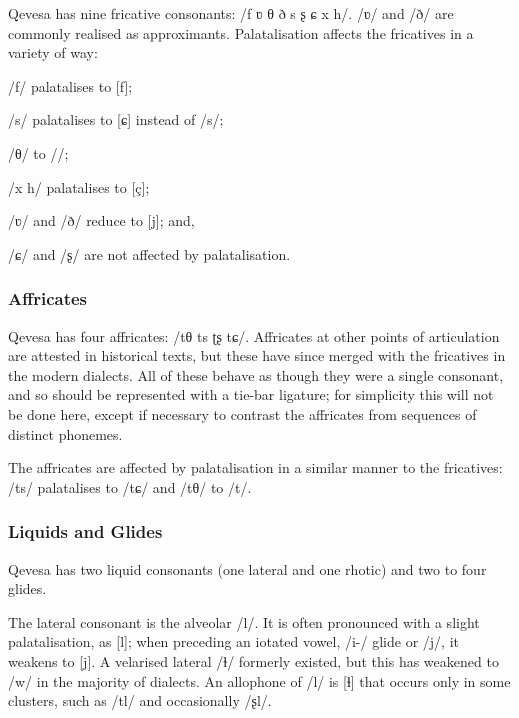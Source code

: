 \documentclass[grammar]{subfiles}
\begin{document}
	Qevesa has nine fricative consonants: /f ʋ θ ð s ʂ ɕ x h/. /ʋ/ and /ð/ are commonly realised as approximants. Palatalisation affects the fricatives in a variety of way: 

	\begin{itemize*}
	\item /f/ palatalises to [f\superj{}];
	\item /s/ palatalises to [ɕ] instead of /s\superj/;
	\item /θ/ to //;
	\item /x h/ palatalises to [ç];
	\item /ʋ/ and /ð/ reduce to [j]; and,
	\item /ɕ/ and /ʂ/ are not affected by palatalisation.
	\end{itemize*}

	\subsubsection{Affricates}
	\label{sssec:affricates}

	Qevesa has four affricates: /tθ ts ʈʂ tɕ/. Affricates at other points of articulation are attested in historical texts, but these have since merged with the fricatives in the modern dialects. All of these behave as though they were a single consonant, and so should be represented with a tie-bar ligature; for simplicity this will not be done here, except if necessary to contrast the affricates from sequences of distinct phonemes. 

	The affricates are affected by palatalisation in a similar manner to the fricatives: /ts/ palatalises to /tɕ/ and /tθ/ to /t/.

	\subsubsection{Liquids and Glides}
	\label{sssec:liquids}

	Qevesa has two liquid consonants (one lateral and one rhotic) and two to four glides.

	The lateral consonant is the alveolar /l/. It is often pronounced with a slight palatalisation, as [l\superj]; when preceding an iotated vowel, /i-/ glide or /j/, it weakens to [j]. A velarised lateral /ɫ/ formerly existed, but this has weakened to /w/ in the majority of dialects. An allophone of /l/ is [ɬ] that occurs only in some clusters, such as /tl/ and occasionally /ʂl/.
\end{document}
